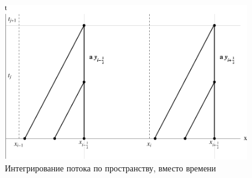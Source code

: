 \documentclass[unicode, 8pt]{beamer}
\begin{document}
     \begin{frame}
         \begin{figure}[h]
             \centering
             \includegraphics[width=0.95\textwidth]{flow_visual.pdf}
             \caption{Интегрирование потока по пространству, вместо времени}
             \label{fig:flow_visual}
         \end{figure}
     \end{frame}
\end{document}
